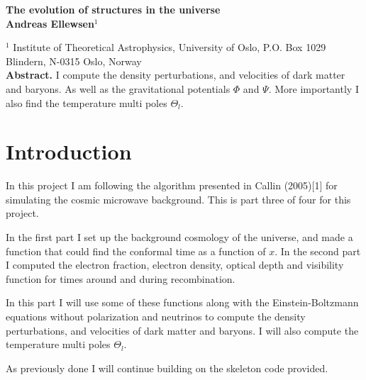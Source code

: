 \documentclass[a4paper]{report}
\begin{document}
  

\vspace*{4ex}

\begin{center}
  {\Large \bf The evolution of structures in the universe}\\[4ex]
  {\large \bf Andreas Ellewsen$^1$}\\[4ex]
  \begin{minipage}[t]{15cm}
        $^1$ Institute of Theoretical Astrophysics, University of Oslo, P.O. Box 1029 Blindern, N-0315 Oslo, Norway\\

    {\bf Abstract.} I compute the density perturbations, and velocities of dark matter and baryons. As well as the gravitational potentials $\Phi$ and $\Psi$. More importantly I also find the temperature multi poles $\Theta_l$.
    
  \vspace*{2ex}
  \end{minipage}
\end{center}
\section{Introduction}\label{sec:introduction}
In this project I am following the algorithm presented in Callin (2005)[1] for simulating the cosmic microwave background.  
This is part three of four for this project.

In the first part I set up the background cosmology of the universe, and made a function that could find the conformal time as a function of $x$. In the second part I computed the electron fraction, electron density, optical depth and visibility function for times around and during recombination. 

In this part I will use some of these functions along with the Einstein-Boltzmann equations without polarization and neutrinos to compute the density perturbations, and velocities of dark matter and baryons. I will also compute the temperature multi poles $\Theta_l$.

As previously done I will continue building on the skeleton code provided.

\end{document}
